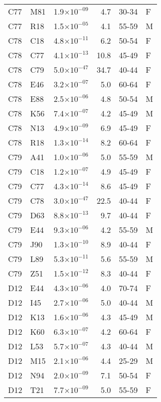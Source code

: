 \begin{longtable}{lllrll}
   C77 & M81 & 1.9$\times10^{-09}$ & 4.7 & 30-34 & F \\ 
   C77 & R18 & 1.5$\times10^{-05}$ & 4.1 & 55-59 & M \\ 
   C78 & C18 & 4.8$\times10^{-11}$ & 6.2 & 50-54 & F \\ 
   C78 & C77 & 4.1$\times10^{-13}$ & 10.8 & 45-49 & F \\ 
   C78 & C79 & 5.0$\times10^{-47}$ & 34.7 & 40-44 & F \\ 
   C78 & E46 & 3.2$\times10^{-07}$ & 5.0 & 60-64 & F \\ 
   C78 & E88 & 2.5$\times10^{-06}$ & 4.8 & 50-54 & M \\ 
   C78 & K56 & 7.4$\times10^{-07}$ & 4.2 & 45-49 & M \\ 
   C78 & N13 & 4.9$\times10^{-09}$ & 6.9 & 45-49 & F \\ 
   C78 & R18 & 1.3$\times10^{-14}$ & 8.2 & 60-64 & F \\ 
   C79 & A41 & 1.0$\times10^{-06}$ & 5.0 & 55-59 & M \\ 
   C79 & C18 & 1.2$\times10^{-07}$ & 4.9 & 45-49 & F \\ 
   C79 & C77 & 4.3$\times10^{-14}$ & 8.6 & 45-49 & F \\ 
   C79 & C78 & 3.0$\times10^{-47}$ & 22.5 & 40-44 & F \\ 
   C79 & D63 & 8.8$\times10^{-13}$ & 9.7 & 40-44 & F \\ 
   C79 & E44 & 9.3$\times10^{-06}$ & 4.2 & 55-59 & M \\ 
   C79 & J90 & 1.3$\times10^{-10}$ & 8.9 & 40-44 & F \\ 
   C79 & L89 & 5.3$\times10^{-11}$ & 5.6 & 55-59 & M \\ 
   C79 & Z51 & 1.5$\times10^{-12}$ & 8.3 & 40-44 & F \\ 
   D12 & E44 & 4.3$\times10^{-06}$ & 4.0 & 70-74 & F \\ 
   D12 & I45 & 2.7$\times10^{-06}$ & 5.0 & 40-44 & M \\ 
   D12 & K13 & 1.6$\times10^{-06}$ & 4.3 & 45-49 & M \\ 
   D12 & K60 & 6.3$\times10^{-07}$ & 4.2 & 60-64 & F \\ 
   D12 & L53 & 5.7$\times10^{-07}$ & 4.3 & 40-44 & M \\ 
   D12 & M15 & 2.1$\times10^{-06}$ & 4.4 & 25-29 & M \\ 
   D12 & N94 & 2.0$\times10^{-09}$ & 7.1 & 50-54 & F \\ 
   D12 & T21 & 7.7$\times10^{-09}$ & 5.0 & 55-59 & F \\ 

\end{longtable}
